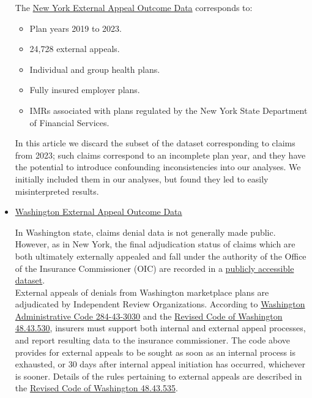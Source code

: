 \documentclass[12pt, a4paper,twoside]{report}
\theoremstyle{plain} %
\theoremstyle{definition} %
\theoremstyle{remark} %
\numberwithin{equation}{chapter}
\begin{document}
\begin{itemize}
\begin{tcolorbox}
			The \href{https://www.dfs.ny.gov/public-appeal/search}{New York External Appeal Outcome Data} corresponds to:
			
			\begin{itemize}
				\item Plan years 2019 to 2023.
				\item 24,728 external appeals.
				\item Individual and group health plans.
				\item Fully insured employer plans.
				\item IMRs associated with plans regulated by the New York State Department of Financial Services.
				
			\end{itemize}
		
			In this article we discard the subset of the dataset corresponding to claims from 2023; such claims correspond to an incomplete plan year, and they have the potential to introduce confounding inconsistencies into our analyses. We initially included them in our analyses, but found they led to easily misinterpreted results.
		
			\end{tcolorbox}
			
			\item \href{https://fortress.wa.gov/oic/consumertoolkit/Search.aspx?searchtype=indrev}{Washington External Appeal Outcome Data}\\
			
			\begin{tcolorbox}
				
			In Washington state, claims denial data is not generally made public. However, as in New York, the final adjudication status of claims which are both ultimately externally appealed and fall under the authority of the Office of the Insurance Commissioner (OIC) are recorded in a \href{https://fortress.wa.gov/oic/consumertoolkit/Search.aspx?searchtype=indrev}{publicly accessible dataset}.\\
			
			External appeals of denials from Washington marketplace plans are adjudicated by Independent Review Organizations. According to \href{https://apps.leg.wa.gov/wac/default.aspx?cite=284-43-3030}{Washington Administrative Code 284-43-3030} and the \href{https://app.leg.wa.gov/RCW/default.aspx?cite=48.43.530}{Revised Code of Washington 48.43.530}, insurers must support both internal and external appeal processes, and report resulting data to the insurance commissioner. The code above provides for external appeals to be sought as soon as an internal process is exhausted, or 30 days after internal appeal initiation has occurred, whichever is sooner. Details of the rules pertaining to external appeals are described in the \href{https://app.leg.wa.gov/rcw/default.aspx?cite=48.43.535}{Revised Code of Washington 48.43.535}.\\
			

\end{tcolorbox}
\end{itemize}
\end{document}
